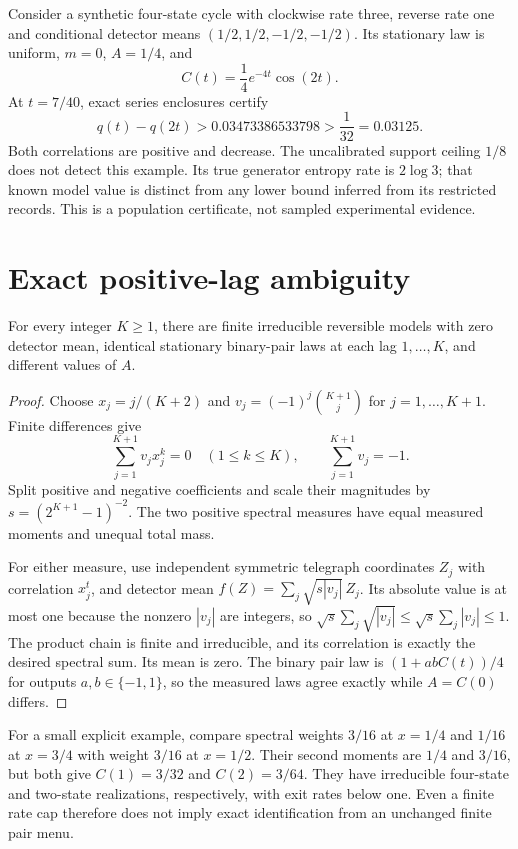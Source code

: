Consider a synthetic four-state cycle with clockwise rate three, reverse rate
one and conditional detector means $(1/2,1/2,-1/2,-1/2)$. Its stationary law is
uniform, $m=0$, $A=1/4$, and
\[
 C(t)=\frac14 e^{-4t}\cos(2t).
\]
At $t=7/40$, exact series enclosures certify
\[
 q(t)-q(2t)>0.03473386533798
 >\frac1{32}=0.03125.
\]
Both correlations are positive and decrease. The uncalibrated support ceiling
$1/8$ does not detect this example. Its true generator entropy rate is
$2\log3$; that known model value is distinct from any lower bound inferred from
its restricted records. This is a population certificate, not sampled
experimental evidence.

\section{Exact positive-lag ambiguity}
\begin{theorem}
For every integer $K\geq1$, there are finite irreducible reversible models with
zero detector mean, identical stationary binary-pair laws at each lag
$1,\ldots,K$, and different values of $A$.
\end{theorem}
\begin{proof}
Choose $x_j=j/(K+2)$ and $v_j=(-1)^j{K+1\choose j}$ for
$j=1,\ldots,K+1$. Finite differences give
\[
 \sum_{j=1}^{K+1}v_jx_j^k=0\quad(1\leq k\leq K),
 \qquad \sum_{j=1}^{K+1}v_j=-1.
\]
Split positive and negative coefficients and scale their magnitudes by
$s=(2^{K+1}-1)^{-2}$. The two positive spectral measures have equal measured
moments and unequal total mass.

For either measure, use independent symmetric telegraph coordinates $Z_j$ with
correlation $x_j^t$, and detector mean
$f(Z)=\sum_j\sqrt{s|v_j|}\,Z_j$. Its absolute value is at most one because the nonzero $|v_j|$ are integers,
so $\sqrt{s}\sum_j\sqrt{|v_j|}\leq\sqrt{s}\sum_j|v_j|\leq1$. The product chain is finite and irreducible, and its
correlation is exactly the desired spectral sum. Its mean is zero. The binary
pair law is $(1+abC(t))/4$ for outputs $a,b\in\{-1,1\}$, so the measured laws
agree exactly while $A=C(0)$ differs.
\end{proof}

For a small explicit example, compare spectral weights $3/16$ at $x=1/4$ and
$1/16$ at $x=3/4$ with weight $3/16$ at $x=1/2$. Their second moments are
$1/4$ and $3/16$, but both give $C(1)=3/32$ and $C(2)=3/64$. They have
irreducible four-state and two-state realizations, respectively, with exit rates
below one. Even a finite rate cap therefore does not imply exact identification
from an unchanged finite pair menu.

